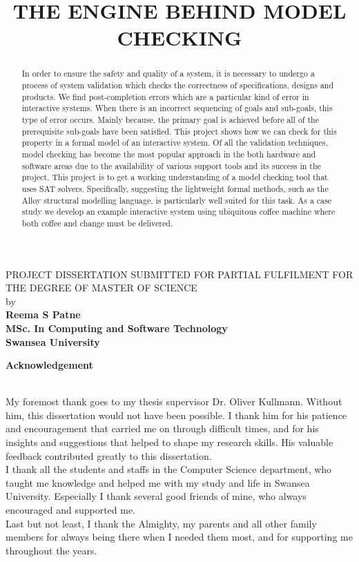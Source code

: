 \documentclass[a4paper,12pt]{extarticle}
\begin{document}
\title{THE ENGINE BEHIND MODEL CHECKING}
\maketitle
\begin{center}
\textsf{
PROJECT DISSERTATION SUBMITTED FOR PARTIAL FULFILMENT FOR THE DEGREE OF MASTER OF SCIENCE \\ by \\ 
}
\textbf{Reema S Patne \\ MSc. In Computing and Software Technology \\ Swansea University}
\end{center}
\newpage  
\begin{abstract}
\textsf{In order to ensure the safety and quality of a system, it is necessary to undergo a process of system validation which checks the correctness of specifications, designs and products. We find post-completion errors which are a particular kind of error in interactive systems. When there is an incorrect sequencing of goals and sub-goals, this type of error occurs. Mainly because, the primary goal is achieved before all of the prerequisite sub-goals have been satisfied. This project shows how we can check for this property in a formal model of an interactive system. Of all the validation techniques, model checking has become the most popular approach in the both hardware and software areas due to the availability of various support tools and its success in the project. This project is to get a working understanding of a model checking tool that uses SAT solvers. Specifically, suggesting the lightweight formal methods, such as the Alloy structural modelling language, is particularly well suited for this task. As a case study we develop an example interactive system using ubiquitous coffee machine where both coffee and change must be delivered.}
\end{abstract}
\newpage
\begin{center}
\textbf{Acknowledgement\\}
\end{center}
\textsf{ \\ My foremost thank goes to my thesis supervisor Dr. Oliver Kullmann. Without him, this dissertation would not have been possible. I thank him for his patience and encouragement that carried me on through difficult times, and for his insights and suggestions that helped to shape my research skills. His valuable feedback contributed greatly to this dissertation.\\ I thank all the students and staffs in the Computer Science department, who taught me knowledge and helped me with my study and life in Swansea University. Especially I thank several good friends of mine, who always encouraged and supported me.\\ Last but not least, I thank the Almighty, my parents and all other family members for always being there when I needed them most, and for supporting me throughout the years.}
\end{document}
